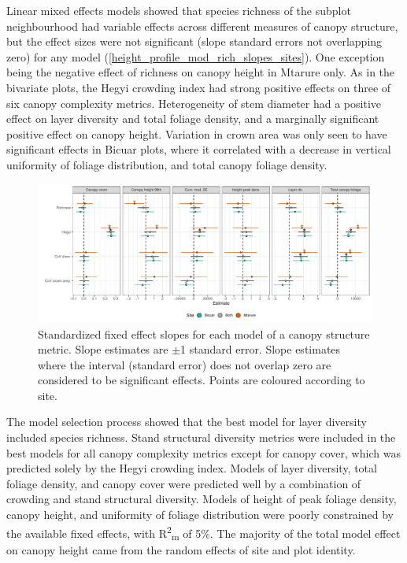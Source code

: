 \documentclass[11pt,a4paper]{article}
\newcommand{\textapprox}{\raisebox{0.5ex}{\texttildelow}}  %
\begin{document}
Linear mixed effects models showed that species richness of the subplot neighbourhood had variable effects across different measures of canopy structure, but the effect sizes were not significant (slope standard errors not overlapping zero) for any model (\autoref{height_profile_mod_rich_slopes_sites}). One exception being the negative effect of richness on canopy height in Mtarure only. As in the bivariate plots, the Hegyi crowding index had strong positive effects on three of six canopy complexity metrics. Heterogeneity of stem diameter had a positive effect on layer diversity and total foliage density, and a marginally significant positive effect on canopy height. Variation in crown area was only seen to have significant effects in Bicuar plots, where it correlated with a decrease in vertical uniformity of foliage distribution, and total canopy foliage density.

\begin{figure}[H]
\centering
	\includegraphics[width=\textwidth]{height_profile_mod_rich_slopes_sites}
	\caption{Standardized fixed effect slopes for each model of a canopy structure metric. Slope estimates are $\pm$1 standard error. Slope estimates where the interval (standard error) does not overlap zero are considered to be significant effects. Points are coloured according to site.}
	\label{height_profile_mod_rich_slopes_sites}
\end{figure}

The model selection process showed that the best model for layer diversity included species richness. Stand structural diversity metrics were included in the best models for all canopy complexity metrics except for canopy cover, which was predicted solely by the Hegyi crowding index. Models of layer diversity, total foliage density, and canopy cover were predicted well by a combination of crowding and stand structural diversity. Models of height of peak foliage density, canopy height, and uniformity of foliage distribution were poorly constrained by the available fixed effects, with R\textsuperscript{2}\textsubscript{m} of \textapprox{}5\%. The majority of the total model effect on canopy height came from the random effects of site and plot identity.
\end{document}
